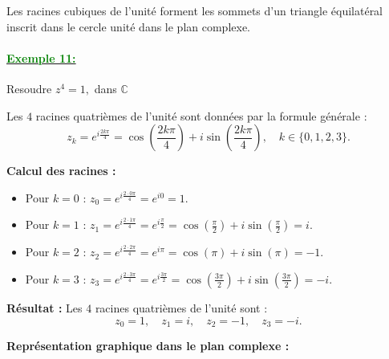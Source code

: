 \documentclass[12pt]{article}
\begin{document}
Les racines cubiques de l'unité forment les sommets d'un triangle équilatéral inscrit dans le cercle unité dans le plan complexe.


\paragraph{\underline{\textbf{\textcolor{green}{Exemple 11: }}}}

Resoudre \( z^4 = 1, \) dans $\mathbb{C}$

Les \(4\) racines quatrièmes de l’unité sont données par la formule générale :
\[
z_k = e^{i\frac{2k\pi}{4}} = \cos\left(\frac{2k\pi}{4}\right) + i\sin\left(\frac{2k\pi}{4}\right), \quad k \in \{0, 1, 2, 3\}.
\]

\textbf{Calcul des racines :}
\begin{itemize}
    \item Pour \(k = 0\) : 
    \(
    z_0 = e^{i\frac{2\cdot 0\pi}{4}} = e^{i0} = 1.
    \)
    \item Pour \(k = 1\) : 
    \(
    z_1 = e^{i\frac{2\cdot 1\pi}{4}} = e^{i\frac{\pi}{2}} = \cos\left(\frac{\pi}{2}\right) + i\sin\left(\frac{\pi}{2}\right) = i.
    \)
    \item Pour \(k = 2\) : 
    \(
    z_2 = e^{i\frac{2\cdot 2\pi}{4}} = e^{i\pi} = \cos(\pi) + i\sin(\pi) = -1.
    \)
    \item Pour \(k = 3\) : 
    \(
    z_3 = e^{i\frac{2\cdot 3\pi}{4}} = e^{i\frac{3\pi}{2}} = \cos\left(\frac{3\pi}{2}\right) + i\sin\left(\frac{3\pi}{2}\right) = -i.
    \)
\end{itemize}

\textbf{Résultat :} Les \(4\) racines quatrièmes de l’unité sont :
\[
z_0 = 1, \quad z_1 = i, \quad z_2 = -1, \quad z_3 = -i.
\]

\textbf{Représentation graphique dans le plan complexe :}

\begin{center}
\end{center}
\end{document}
